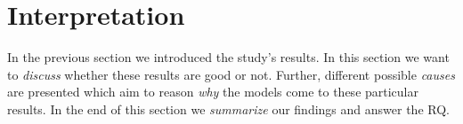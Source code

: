 \section{Interpretation}
\label{chp:study:sec:interpretation}
In the previous section we introduced the study's results.
In this section we want to \textit{discuss} whether these results are good or not.
Further, different possible \textit{causes} are presented which aim to reason \textit{why} the models come to these particular results.
In the end of this section we \textit{summarize} our findings and answer the \ac{RQ}.




